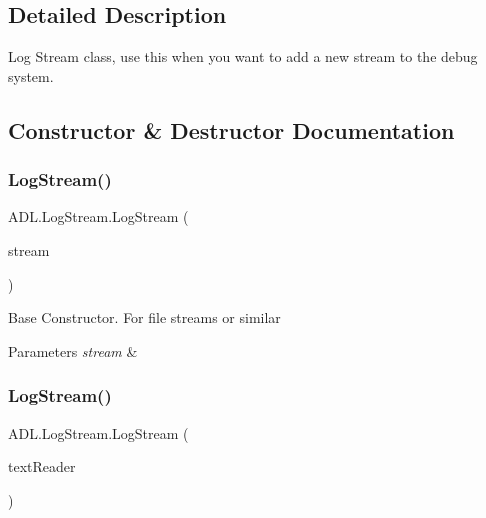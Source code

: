 \subsection{Detailed Description}
Log Stream class, use this when you want to add a new stream to the debug system. 



\subsection{Constructor \& Destructor Documentation}
\mbox{\label{class_a_d_l_1_1_log_stream_a1f2e350b81d2c832024547590d918782}} 
\subsubsection{\texorpdfstring{Log\+Stream()}{LogStream()}\hspace{0.1cm}{\footnotesize\ttfamily [1/2]}}
{\footnotesize\ttfamily A\+D\+L.\+Log\+Stream.\+Log\+Stream (\begin{DoxyParamCaption}\item[{Stream}]{stream }\end{DoxyParamCaption})}



Base Constructor. For file streams or similar 


\begin{DoxyParams}{Parameters}
{\em stream} & \\
\hline
\end{DoxyParams}
\mbox{\label{class_a_d_l_1_1_log_stream_a7fa87cb8c69e1c56bfdbd1d09093bb49}} 
\subsubsection{\texorpdfstring{Log\+Stream()}{LogStream()}\hspace{0.1cm}{\footnotesize\ttfamily [2/2]}}
{\footnotesize\ttfamily A\+D\+L.\+Log\+Stream.\+Log\+Stream (\begin{DoxyParamCaption}\item[{Text\+Writer}]{text\+Reader }\end{DoxyParamCaption})}



